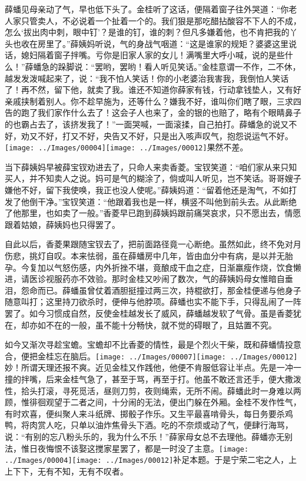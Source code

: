 薛蟠见母亲动了气，早也低下头了。金桂听了这话，便隔着窗子往外哭道：``你老人家只管卖人，不必说着一个扯着一个的。我们狠是那吃醋拈酸容不下人的不成，怎么`拔出肉中刺，眼中钉'？是谁的钉，谁的刺？但凡多嫌着他，也不肯把我的丫头也收在房里了。''薛姨妈听说，气的身战气咽道：``这是谁家的规矩？婆婆这里说话，媳妇隔着窗子拌嘴。亏你是旧家人家的女儿！满嘴里大呼小喊，说的是些什么！''薛蟠急的跺脚说：``罢哟，罢哟！看人听见笑话。''金桂意谓一不作，二不休，越发发泼喊起来了，说：``我不怕人笑话！你的小老婆治我害我，我倒怕人笑话了！再不然，留下他，就卖了我。谁还不知道你薛家有钱，行动拿钱垫人，又有好亲戚挟制着别人。你不趁早施为，还等什么？嫌我不好，谁叫你们瞎了眼，三求四告的跑了我们家作什么去了！这会子人也来了，金的银的也赔了，略有个眼睛鼻子的也霸占去了，该挤发我了！''一面哭喊，一面滚揉，自己拍打。薛蟠急的说又不好，劝又不好，打又不好，央告又不好，只是出入咳声叹气，抱怨说运气不好。{\texttt{[image: ../Images/00004]}\texttt{[image: ../Images/00012]}\footnotesize \kaishu 果然不差。}

当下薛姨妈早被薛宝钗劝进去了，只命人来卖香菱。宝钗笑道：``咱们家从来只知买人，并不知卖人之说。妈可是气的糊涂了，倘或叫人听见，岂不笑话。哥哥嫂子嫌他不好，留下我使唤，我正也没人使呢。''薛姨妈道：``留着他还是淘气，不如打发了他倒干净。''宝钗笑道：``他跟着我也是一样，横竖不叫他到前头去。从此断绝了他那里，也如卖了一般。''香菱早已跑到薛姨妈跟前痛哭哀求，只不愿出去，情愿跟着姑娘，薛姨妈也只得罢了。

自此以后，香菱果跟随宝钗去了，把前面路径竟一心断绝。虽然如此，终不免对月伤悲，挑灯自叹。本来怯弱，虽在薛蟠房中几年，皆由血分中有病，是以并无胎孕。今复加以气怒伤感，内外折挫不堪，竟酿成干血之症，日渐羸瘦作烧，饮食懒进，请医诊视服药亦不效验。那时金桂又吵闹了数次，气的薛姨妈母女惟暗自垂泪，怨命而已。薛蟠虽曾仗着酒胆挺撞过两三次，持棍欲打，那金桂便递与他身子随意叫打；这里持刀欲杀时，便伸与他脖项。薛蟠也实不能下手，只得乱闹了一阵罢了。如今习惯成自然，反使金桂越发长了威风，薛蟠越发软了气骨。虽是香菱犹在，却亦如不在的一般，虽不能十分畅快，就不觉的碍眼了，且姑置不究。

如今又渐次寻趁宝蟾。宝蟾却不比香菱的情性，最是个烈火干柴，既和薛蟠情投意合，便把金桂忘在脑后。{\texttt{[image: ../Images/00007]}\texttt{[image: ../Images/00012]}\footnotesize \kaishu 妙！所谓天理还报不爽。}近见金桂又作践他，他便不肯服低容让半点。先是一冲一撞的拌嘴，后来金桂气急了，甚至于骂，再至于打。他虽不敢还言还手，便大撒泼性，拾头打滚，寻死觅活，昼则刀剪，夜则绳索，无所不闹。薛蟠此时一身难以两顾，惟徘徊观望于二者之间，十分闹的无法，便出门躲在外厢。金桂不发作性气，有时欢喜，便纠聚人来斗纸牌、掷骰子作乐。又生平最喜啃骨头，每日务要杀鸡鸭，将肉赏人吃，只单以油炸焦骨头下酒。吃的不奈烦或动了气，便肆行海骂，说：``有别的忘八粉头乐的，我为什么不乐！''薛家母女总不去理他。薛蟠亦无别法，惟日夜悔恨不该娶这搅家星罢了，都是一时没了主意。{\texttt{[image: ../Images/00004]}\texttt{[image: ../Images/00012]}\footnotesize \kaishu 补足本题。}于是宁荣二宅之人，上上下下，无有不知，无有不叹者。

